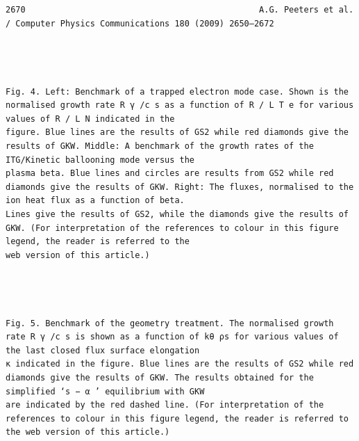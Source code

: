 \documentclass[a4paper]{article}
\newcommand{\gkwpagefont}{\fontsize{6.0pt}{7.55pt}\selectfont}
\begin{document}
\begin{Verbatim}[fontsize=\gkwpagefont]
2670                                               A.G. Peeters et al. / Computer Physics Communications 180 (2009) 2650–2672




Fig. 4. Left: Benchmark of a trapped electron mode case. Shown is the normalised growth rate R γ /c s as a function of R / L T e for various values of R / L N indicated in the
figure. Blue lines are the results of GS2 while red diamonds give the results of GKW. Middle: A benchmark of the growth rates of the ITG/Kinetic ballooning mode versus the
plasma beta. Blue lines and circles are results from GS2 while red diamonds give the results of GKW. Right: The fluxes, normalised to the ion heat flux as a function of beta.
Lines give the results of GS2, while the diamonds give the results of GKW. (For interpretation of the references to colour in this figure legend, the reader is referred to the
web version of this article.)




Fig. 5. Benchmark of the geometry treatment. The normalised growth rate R γ /c s is shown as a function of kθ ρs for various values of the last closed flux surface elongation
κ indicated in the figure. Blue lines are the results of GS2 while red diamonds give the results of GKW. The results obtained for the simplified ‘s − α ’ equilibrium with GKW
are indicated by the red dashed line. (For interpretation of the references to colour in this figure legend, the reader is referred to the web version of this article.)



\end{Verbatim}
\end{document}
